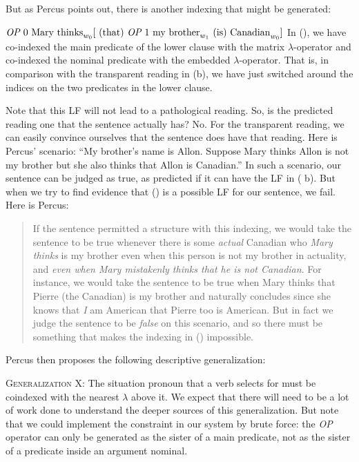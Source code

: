 But as Percus points out, there is another indexing that might be generated:

\ex
$\emph{OP } 0 \mbox{ Mary thinks}_{w_{0}} [ \mbox{ (that) } \emph{OP } 1 \mbox{
  my brother}_{w_{1}} \mbox{ (is) Canadian}_{w_{0}} ]$ \xe
%
In (\lastx), we have co-indexed the main predicate of the lower clause with the
matrix $\lambda$-operator and co-indexed the nominal predicate
 with the embedded $\lambda$-operator. That is, in
comparison with the transparent reading in (\blastx b), we have just switched
around the indices on the two predicates in the lower clause.

Note that this LF will not lead to a pathological reading. So, is the predicted
reading one that the sentence actually has? No. For the transparent reading, we
can easily convince ourselves that the sentence does have that reading. Here is
Percus' scenario: ``My brother's name is Allon. Suppose Mary thinks Allon is not
my brother but she also thinks that Allon is Canadian.'' In such a scenario, our
sentence can be judged as true, as predicted if it can have the LF in (\blastx
b). But when we try to find evidence that (\lastx) is a possible LF for our
sentence, we fail. Here is Percus:

\begin{quote}
  If the sentence permitted a structure with this indexing, we would take the
  sentence to be true whenever there is some \emph{actual} Canadian who
  \emph{Mary thinks} is my brother \dash even when this person is not my brother
  in actuality, and \emph{even when Mary mistakenly thinks that he is not
    Canadian}. For instance, we would take the sentence to be true when Mary
  thinks that Pierre (the Canadian) is my brother and naturally concludes \dash
  since she knows that \emph{I} am American \dash that Pierre too is American.
  But in fact we judge the sentence to be \emph{false} on this scenario, and so
  there must be something that makes the indexing in (\lastx) impossible.
\end{quote}
%
Percus then proposes the following descriptive generalization:

\ex \textsc{Generalization X}: The situation pronoun that a verb selects for
must be coindexed with the nearest $\lambda$ above it. \xe
%
We expect that there will need to be a lot of work done to understand the deeper
sources of this generalization. But note that we could implement the constraint
in our system by brute force: the \emph{OP} operator can only be generated as
the sister of a main predicate, not as the sister of a predicate inside an
argument nominal.

